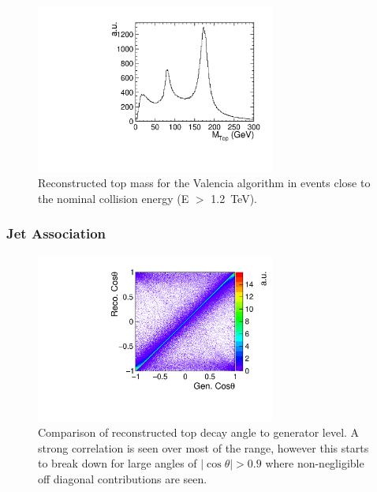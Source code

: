 \begin{figure}
  \centering
  \includegraphics[width=0.7\textwidth]{TopAnalysis/figures/TopMass_EOver1200.pdf}
  \caption[Performance of Valencia algorithm for high energy events]{Reconstructed top mass for the Valencia algorithm in events close to the nominal collision energy (E $>$ 1.2~TeV).}
  \label{fig:highEValencia}
\end{figure}


\subsubsection{Jet Association}
\label{sec:jetassociation}
\begin{figure}
  \centering
  \includegraphics[width=0.7\textwidth]{TopAnalysis/figures/CosThetaRecoVsMC.pdf}
  \caption[Comparison of reconstructed top decay angle to generator level]{Comparison of reconstructed top decay angle to generator level. A strong correlation is seen over most of the range, however this starts to break down for large angles of $\mid \cos\theta \mid>0.9$ where non-negligible off diagonal contributions are seen.}
  \label{fig:2djetangle}
\end{figure}

